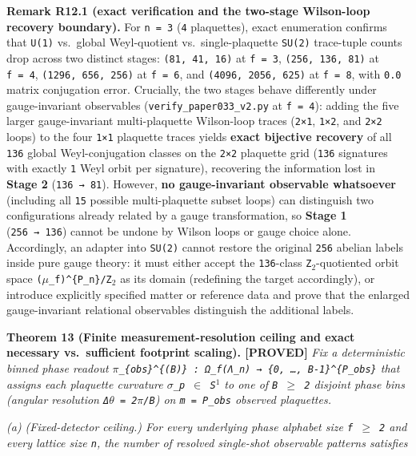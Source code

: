 \documentclass[
  american,
  11pt,
  letterpaper,
]{article}
\begin{document}
\textbf{Remark R12.1 (exact verification and the two-stage Wilson-loop recovery boundary).} For \texttt{n\ =\ 3} (\texttt{4} plaquettes), exact enumeration confirms that \texttt{U(1)} vs.~global Weyl-quotient vs.~single-plaquette \texttt{SU(2)} trace-tuple counts drop across two distinct stages: \texttt{(81,\ 41,\ 16)} at \texttt{f\ =\ 3}, \texttt{(256,\ 136,\ 81)} at \texttt{f\ =\ 4}, \texttt{(1296,\ 656,\ 256)} at \texttt{f\ =\ 6}, and \texttt{(4096,\ 2056,\ 625)} at \texttt{f\ =\ 8}, with \texttt{0.0} matrix conjugation error. Crucially, the two stages behave differently under gauge-invariant observables (\nolinkurl{verify_paper033_v2.py} at \texttt{f\ =\ 4}): adding the five larger gauge-invariant multi-plaquette Wilson-loop traces (\texttt{2×1}, \texttt{1×2}, and \texttt{2×2} loops) to the four \texttt{1×1} plaquette traces yields \textbf{exact bijective recovery} of all \texttt{136} global Weyl-conjugation classes on the \texttt{2×2} plaquette grid (\texttt{136} signatures with exactly \texttt{1} Weyl orbit per signature), recovering the information lost in \textbf{Stage 2} (\texttt{136\ →\ 81}). However, \textbf{no gauge-invariant observable whatsoever} (including all \texttt{15} possible multi-plaquette subset loops) can distinguish two configurations already related by a gauge transformation, so \textbf{Stage 1} (\texttt{256\ →\ 136}) cannot be undone by Wilson loops or gauge choice alone. Accordingly, an adapter into \texttt{SU(2)} cannot restore the original \texttt{256} abelian labels inside pure gauge theory: it must either accept the \texttt{136}-class \texttt{Z\ensuremath{{}_{2}}}-quotiented orbit space \texttt{(\ensuremath{\mu}\_f)\^{}\{P\_n\}/Z\ensuremath{{}_{2}}} as its domain (redefining the target accordingly), or introduce explicitly specified matter or reference data and prove that the enlarged gauge-invariant relational observables distinguish the additional labels.

\textbf{Theorem 13 (Finite measurement-resolution ceiling and exact necessary vs.~sufficient footprint scaling). {[}PROVED{]}} \emph{Fix a deterministic binned phase readout \texttt{\ensuremath{\pi}\_\{obs\}\^{}\{(B)\}\ :\ Ω\_f(Λ\_n)\ →\ \{0,\ …,\ B-1\}\^{}\{P\_obs\}} that assigns each plaquette curvature \texttt{\ensuremath{\sigma}\_p\ \ensuremath{\in}\ S\ensuremath{{}^{1}}} to one of \texttt{B\ \ensuremath{\geq}\ 2} disjoint phase bins (angular resolution \texttt{Δ\ensuremath{\theta}\ =\ 2\ensuremath{\pi}/B}) on \texttt{m\ =\ \textbar{}P\_obs\textbar{}} observed plaquettes.}

\emph{(a) (Fixed-detector ceiling.) For every underlying phase alphabet size \texttt{f\ \ensuremath{\geq}\ 2} and every lattice size \texttt{n}, the number of resolved single-shot observable patterns satisfies}
\end{document}
